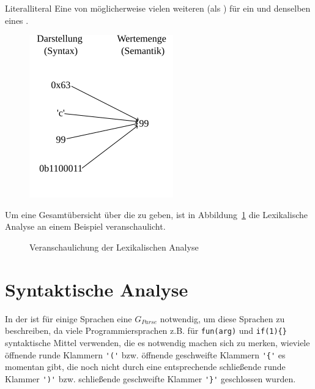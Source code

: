 \begin{Definition}{Literal}{literal}
  Eine von möglicherweise vielen weiteren  (als ) für ein und denselben  eines .
  \begin{figure}[H]
    \centering
    \includegraphics[width=0.33\linewidth]{./figures/literal.png}
  \end{figure}
\end{Definition}

Um eine Gesamtübersicht über die  zu geben, ist in Abbildung~\ref{fig:lexikalische_analyse_veranschaulichung} die Lexikalische Analyse an einem Beispiel veranschaulicht.

\begin{figure}[H]
  \hfill

  \caption{Veranschaulichung der Lexikalischen Analyse}
  \label{fig:lexikalische_analyse_veranschaulichung}
\end{figure}

\section{Syntaktische Analyse}
In der  ist für einige Sprachen eine  $G_{Parse}$ notwendig, um diese Sprachen zu beschreiben, da viele Programmiersprachen z.B. für  \verb|fun(arg)| und  \verb|if(1){}| syntaktische Mittel verwenden, die es notwendig machen sich zu merken, wieviele öffnende runde Klammern \verb|'('| bzw. öffnende geschweifte Klammern \verb|'{'| es momentan gibt, die noch nicht durch eine entsprechende schließende runde Klammer \verb|')'| bzw. schließende geschweifte Klammer \verb|'}'| geschlossen wurden.

